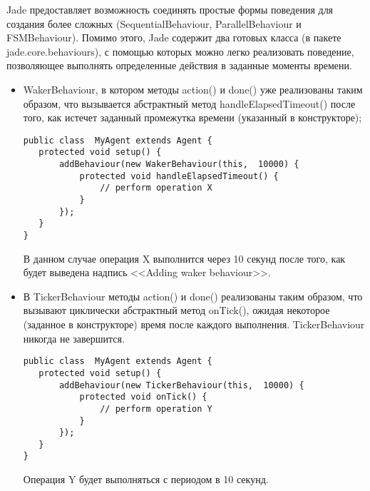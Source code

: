 Jade предоставляет возможность соединять простые формы поведения для создания более сложных (SequentialBehaviour, ParallelBehaviour и FSMBehaviour). Помимо этого, Jade содержит два готовых класса (в пакете jade.core.behaviours), с помощью которых можно легко реализовать поведение, позволяющее выполнять определенные действия в заданные моменты времени.
\begin{itemize}
\item WakerBehaviour, в котором методы action() и done() уже реализованы таким образом, что вызывается абстрактный метод handleElapsedTimeout() после того, как истечет заданный промежутка времени (указанный в конструкторе);
\begin{lstlisting}
public class  MyAgent extends Agent { 
   protected void setup() { 
       addBehaviour(new WakerBehaviour(this,  10000) { 
           protected void handleElapsedTimeout() { 
               // perform operation X 
           } 
       }); 
   } 
}
\end{lstlisting}
В данном случае операция X выполнится через 10 секунд после того, как будет выведена надпись <<Adding waker behaviour>>.
\item В TickerBehaviour методы action() и done() реализованы таким образом, что вызывают циклически абстрактный метод onTick(), ожидая некоторое (заданное в конструкторе) время после каждого выполнения. TickerBehaviour никогда не завершится. 
\begin{lstlisting}
public class  MyAgent extends Agent { 
   protected void setup() { 
       addBehaviour(new TickerBehaviour(this,  10000) { 
           protected void onTick() { 
               // perform operation Y 
           } 
       }); 
   } 
}
\end{lstlisting}
Операция Y будет выполняться с периодом в 10 секунд.
\end{itemize}

